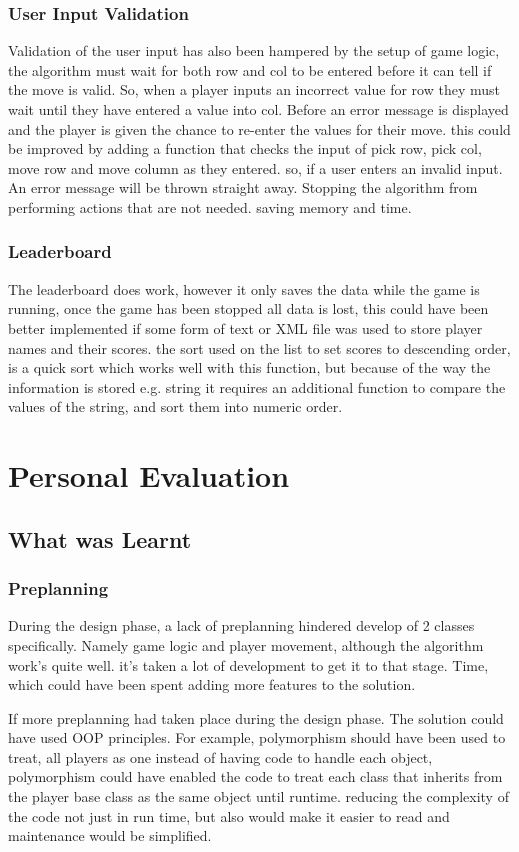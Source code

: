 \documentclass[10pt, a4paper]{article}
\begin{document}
	\subsubsection{User Input Validation}
	Validation of the user input has also been hampered by the setup of game logic, the algorithm must wait for both row and col to be entered before it can tell if the move is valid. So, when a player inputs an incorrect value for row they must wait until they have entered a value into col. Before an error message is displayed and the player is given the chance to re-enter the values for their move. this could be improved by adding a function that checks the input of pick row, pick col, move row and move column as they entered. so, if a user enters an invalid input. An error message will be thrown straight away. Stopping the algorithm from performing actions that are not needed. saving memory and time.
	\subsubsection{Leaderboard}
The leaderboard does work, however it only saves the data while the game is running, once the game has been stopped all data is lost, this could have been better implemented if some form of text or XML file was used to store player names and their scores. the sort used on the list to set scores to descending order, is a quick sort which works well with this function, but because of the way the information is stored e.g. string it requires an additional function to compare the values of the string, and sort them into numeric order.

	\section{Personal Evaluation}
	\subsection{What was Learnt}	
	\subsubsection{Preplanning}
	During the design phase, a lack of preplanning hindered develop of 2 classes specifically. Namely game logic and player movement, although the algorithm work's quite well. it's taken a lot of development to get it to that stage. Time, which could have been spent adding more features to the solution. 

If more preplanning had taken place during the design phase. The solution could have used OOP principles. For example, polymorphism should have been used to treat, all players as one instead of having code to handle each object, polymorphism could have enabled the code to treat each class that inherits from the player base class as the same object until runtime. reducing the complexity of the code not just in run time, but also would make it easier to read and maintenance would be simplified. 
\end{document}
